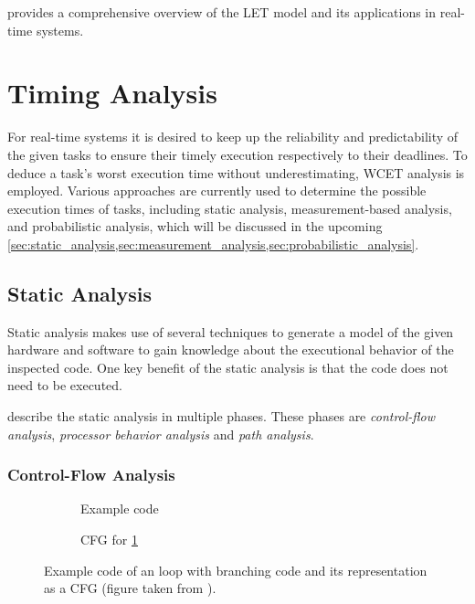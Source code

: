 \textcite{kopetzRealTimeSystemsDesign2022} provides a comprehensive overview of the \ac{LET} model and its applications in real-time systems.


\section{Timing Analysis}\label{sec:timing_analysis}
For real-time systems it is desired to keep up the reliability and predictability of the given tasks to ensure their timely execution respectively to their deadlines.
To deduce a task's worst execution time without underestimating, \ac{WCET} analysis is employed.
Various approaches are currently used to determine the possible execution times of tasks, including static analysis, measurement-based analysis, and probabilistic analysis, which will be discussed in the upcoming \cref{sec:static_analysis,sec:measurement_analysis,sec:probabilistic_analysis}.

\subsection{Static Analysis}\label{sec:static_analysis}
Static analysis makes use of several techniques to generate a model of the given hardware and software to gain knowledge about the executional behavior of the inspected code.
One key benefit of the static analysis is that the code does not need to be executed.

\textcite{wilhelmWorstcaseExecutiontimeProblem2008} describe the static analysis in multiple phases.
These phases are \textit{control-flow analysis}, \textit{processor behavior analysis} and \textit{path analysis}.

\subsubsection{Control-Flow Analysis}\label{sec:cfa}

\begin{figure}[h]
	\begin{subfigure}[c]{0.45\textwidth}
		
		\caption{Example code}
		\label{fig:cfg_code}
	\end{subfigure}
	\hfill
	\begin{subfigure}[c]{0.45\textwidth}
		
		\caption{\ac{CFG} for \cref{fig:cfg_code}}
		\label{fig:cfg}
	\end{subfigure}
	\caption{Example code of an loop with branching code and its representation as a \ac{CFG} (figure taken from \cite{liCacheModelingRealtime1996}).}
	\label{fig:code_and_cfg}
\end{figure}

